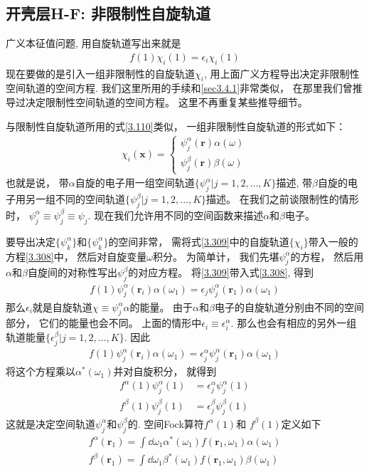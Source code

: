 \subsection{开壳层H-F: 非限制性自旋轨道}
广义\hft 本征值问题, 
用自旋轨道写出来就是
\begin{align}
	f(1)\chi_i(1) = \epsilon_i \chi_i(1)
\end{align}
现在要做的是引入一组非限制性的自旋轨道$\chi_i$, 
用上面广义\hft 方程导出决定非限制性空间轨道的空间方程. 
我们这里所用的手续和\ref{sec3.4.1}非常类似，
在那里我们曾推导过决定限制性空间轨道的空间方程。
这里不再重复某些推导细节。


与限制性自旋轨道所用的式\eqref{3.110}类似，
一组非限制性自旋轨道的形式如下：
\begin{align}
	\chi_i(\mathbf{x}) =
	\begin{cases*}
		\psi_j^\alpha(\mathbf{r})\alpha(\omega)\\
		\psi_j^\beta (\mathbf{r})\beta(\omega)
	\end{cases*}
\end{align}
也就是说，
带$\alpha$自旋的电子用一组空间轨道$\{\psi_j^\alpha |j=1,2,\ldots,K \}$描述, 
带$\beta$自旋的电子用另一组不同的空间轨道$\{\psi_j^\beta |j=1,2,\ldots,K \}$描述。
在我们之前谈限制性的情形时，
$\psi_j^\alpha \equiv \psi_j^\beta \equiv \psi_j$. 
现在我们允许用不同的空间函数来描述$\alpha$和$\beta$电子。


要导出决定$\{\psi_k^\alpha \}$和$\{\psi_k^\alpha \}$的空间非常，
需将式\eqref{3.309}中的自旋轨道$\{\chi_i\}$带入一般的\hft 方程\eqref{3.308}中，
然后对自旋变量$\omega$积分。
为简单计，
我们先堪$\psi_j^\alpha$的方程，
然后用$\alpha$和$\beta$自旋间的对称性写出$\psi_j^\beta$的对应方程。
将\eqref{3.309}带入式\eqref{3.308}, 
得到
\begin{align}
	f(1)\psi_j^\alpha(\mathbf{r}_i) \alpha(\omega_1) = \epsilon_j \psi_j^\alpha(\mathbf{r}_1) \alpha(\omega_1)
\end{align}
那么$\epsilon_i$就是自旋轨道$\chi\equiv\psi_j^\alpha\alpha$的能量。
由于$\alpha$和$\beta$电子的自旋轨道分别由不同的空间部分，
它们的能量也会不同。
上面的情形中$\epsilon_i\equiv\epsilon^\alpha_i$. 
那么也会有相应的另外一组轨道能量$\{\epsilon_j^\beta | j=1,2,\ldots,K\}$. 
因此
\begin{align}
	f(1)\psi_j^\alpha(\mathbf{r}_i) \alpha(\omega_1) = \epsilon_j^\alpha \psi_j^\alpha(\mathbf{r}_1) \alpha(\omega_1)
\end{align}
将这个方程乘以$\alpha^*(\omega_1)$并对自旋积分，
就得到
\begin{align}
	f^\alpha(1)\psi_j^\alpha(1) & = \epsilon_j^\alpha \psi_j^\alpha(1)\\
	f^\beta (1)\psi_j^\beta(1)  & = \epsilon_j^\beta \psi_j^\beta(1)
\end{align}
这就是决定空间轨道$\psi_j^\alpha$和$\psi_j^\beta$的. 
空间Fock算符$f^\alpha(1)$和 $f^\beta (1)$定义如下
\begin{align}
	f^\alpha(\mathbf{r}_1) = \int\dd\omega_1 \alpha^*(\omega_1) f(\mathbf{r}_1,\omega_1)\alpha(\omega_1)\\
	f^\beta(\mathbf{r}_1) = \int\dd\omega_1 \beta^*(\omega_1) f(\mathbf{r}_1,\omega_1)\beta(\omega_1)
\end{align}

